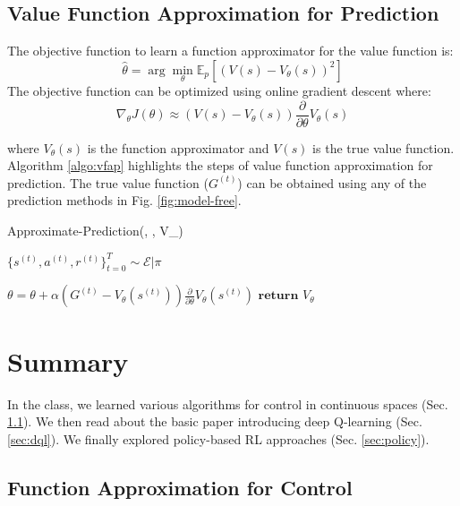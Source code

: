 \documentclass[11pt]{article}
\begin{document}
\subsection{Value Function Approximation for Prediction}

The objective function to learn a function approximator for the value function is:
\begin{equation}
    \hat{\theta} = \arg \min\limits_\theta\mathbb{E}_p \left[(V(s) - V_{\theta}(s))^2 \right]
\end{equation}
The objective function can be optimized using online gradient descent where:
\begin{equation}
    \nabla_{\theta}J(\theta) \approx (V(s) - V_{\theta}(s)) \frac{\partial}{\partial \theta} V_{\theta}(s)
\end{equation}

where $V_{\theta}(s)$ is the function approximator and $V(s)$ is the true value function. Algorithm \ref{algo:vfap} highlights the steps of value function approximation for prediction. The true value function ($G^{(t)}$) can be obtained using any of the prediction methods in Fig. \ref{fig:model-free}.

\begin{algorithm}[H]
\caption{Approximate-Prediction(\pi, \alpha, V_{\theta})}
\label{algo:vfap}
\begin{algorithmic}[1]

\STATE $\{s^{(t)}, a^{(t)}, r^{(t)}\}_{t=0}^T \sim \mathcal{E}|\pi$

\STATE $\theta = \theta + \alpha \left( G^{(t)} - V_{\theta}(s^{(t)})\right)\frac{\partial}{\partial \theta}V_{\theta}(s^{(t)})$
\ENDFOR
\ENDFOR
\STATE $\textbf{return } V_{\theta}$
\end{algorithmic}
\end{algorithm}

\section{Summary}
In the class, we learned various algorithms for control in continuous spaces (Sec. \ref{sec:fac}). We then read about the basic paper introducing deep Q-learning (Sec. \ref{sec:dql}). We finally explored policy-based RL approaches (Sec. \ref{sec:policy}).

\subsection{Function Approximation for Control}
\label{sec:fac}
\end{document}
